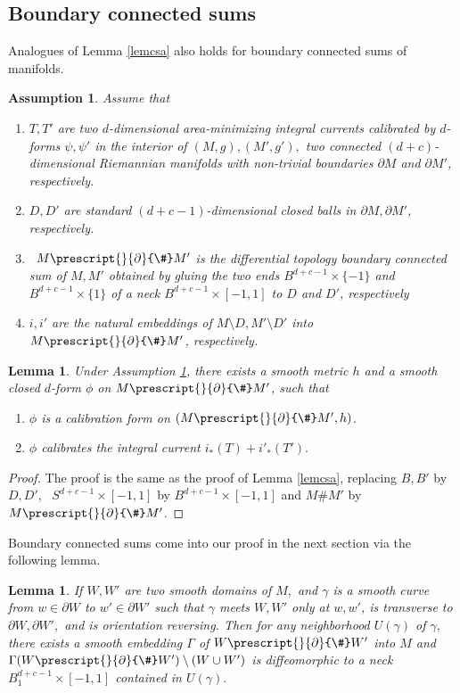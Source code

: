 \documentclass[11pt,a4paper]{amsart}
\numberwithin{equation}{section}
\newcommand{\Ga}{\Gamma}
\newcommand{\ga}{\gamma}
\newcommand{\bcs}{\prescript{}{\pd}{\#}}
\newcommand{\pf}{_\ast}
\newcommand{\pd}{\partial}
\theoremstyle{plain}
\newtheorem{lem}[exam]{Lemma}
\newtheorem{assump}[exam]{Assumption}
\theoremstyle{definition}
\numberwithin{equation}{subsection}
\begin{document}
	\subsection{Boundary connected sums}
	Analogues of Lemma \ref{lemcsa} also holds for boundary connected sums of manifolds.
	\begin{assump}\label{assumpcsb}Assume that
		\begin{enumerate}
			\item $T,T'$ are two $d$-dimensional area-minimizing integral currents calibrated by $d$-forms $\psi,\psi'$ in the interior of $(M,g),(M',g'),$ two connected $(d+c)$-dimensional Riemannian manifolds with non-trivial boundaries $\pd M$ and $\pd M'$, respectively.
			\item $D,D'$ are	standard $(d+c-1)$-dimensional closed balls in $\pd M,\pd M'$, respectively. 
			\item  $M\prescript{}{\pd}{\#} M'$ is the differential topology boundary connected sum of $M,M'$ obtained by gluing the two ends $B^{d+c-1}\times\{-1\}$ and $B^{d+c-1}\times\{1\}$ of a neck $B^{d+c-1}\times[-1,1]$ to $D$ and $D'$, respectively
			\item $i,i'$ are the natural embeddings of $M\setminus D,M'\setminus D'$ into $M\prescript{}{\pd}{\#} M'$, respectively.
	\end{enumerate}\end{assump}
	\begin{lem}\label{lemcsb}
		Under Assumption \ref{assumpcsb}, there exists a smooth metric $h$ and a smooth closed $d$-form $\phi$ on $M\prescript{}{\pd}{\#} M'$, such that
		\begin{enumerate}
			\item $\phi$ is a calibration form on $(M\prescript{}{\pd}{\#} M',h)$.
			\item $\phi$ calibrates the integral current $i\pf(T)+i'\pf(T').$
		\end{enumerate}
	\end{lem}
	\begin{proof}
		The proof is the same as the proof of Lemma \ref{lemcsa}, replacing $B,B'$ by $D,D'$,  $S^{d+c-1}\times[-1,1]$ by $B^{d+c-1}\times[-1,1]$ and $M\#M'$ by $M\prescript{}{\pd}{\#}M'$.
	\end{proof}
	Boundary connected sums come into our proof in the next section via the following lemma.
	\begin{lem}\label{lembcsd}
		If $W,W'$ are two smooth domains of $M,$ and $\ga$ is a smooth curve from $w\in \pd W$ to $w'\in \pd W'$ such that $\ga$ meets $W,W'$ only at $w,w'$, is transverse to $\pd W,\pd W',$ and is orientation reversing. Then for any neighborhood $U(\ga)$ of $\ga,$ there exists a smooth embedding $\Ga$ of $W\bcs W'$ into $M$ and $\Ga(W\bcs W')\setminus (W\cup W')$ is diffeomorphic to a neck $B_1^{d+c-1}\times[-1,1]$ contained in $U(\ga).$
	\end{lem}
\end{document}
